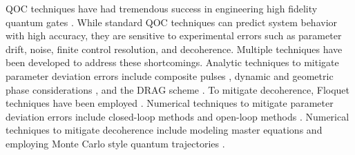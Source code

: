 QOC techniques have had tremendous success in
engineering high fidelity quantum gates \cite{
  chou2015optimal, dolde2014high, egger2013optimized, egger2014adaptive,
  grace2007optimal, heeres2017implementing, huang2014optimal,
  kelly2014optimal, leng2019robust, liebermann2016optimal,
  nebendahl2009optimal, rebentrost2009optimal, rebentrost2009optimal2,
  spiteri2018quantum, sporl2007optimal}. 
While standard QOC techniques can predict system behavior
with high accuracy, they are sensitive to experimental
errors such as parameter drift, noise, finite control 
resolution, and decoherence. Multiple techniques have been developed to address
these shortcomings. Analytic techniques to mitigate parameter deviation errors
include composite pulses \cite{cummins2000use, cummins2003tackling,
  kupce1995stretched, merrill2014progress},
dynamic and geometric phase considerations
\cite{han2020experimental, xu2020nonadiabatic},
and the DRAG scheme .
To mitigate decoherence, Floquet techniques have been employed
\cite{huang2020engineering, mundada2020floquet}.
Numerical techniques to mitigate parameter deviation errors
include closed-loop methods \cite{egger2014adaptive, feng2018gradient, huang2020engineering,
  wittler2020integrated} and open-loop methods \cite{
  allen2019robust, carvalho2020error, reinhold2019controlling,
  rembold2020introduction, kosut2013robust}.
Numerical techniques to mitigate decoherence include
modeling master equations \cite{rembold2020introduction} and employing
Monte Carlo style quantum trajectories \cite{abdelhafez2019gradient}.

